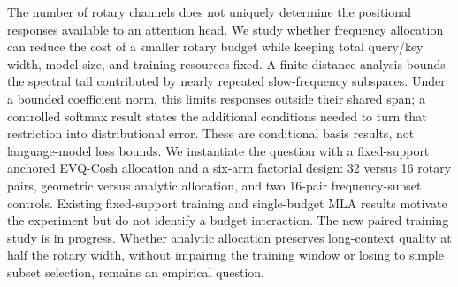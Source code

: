 The number of rotary channels does not uniquely determine the positional
responses available to an attention head. We study whether frequency allocation
can reduce the cost of a smaller rotary budget while keeping total query/key
width, model size, and training resources fixed. A finite-distance analysis bounds
the spectral tail contributed by nearly repeated slow-frequency subspaces.
Under a bounded coefficient norm, this limits responses outside their shared
span; a controlled softmax result states the additional conditions needed to
turn that restriction into distributional error. These are conditional basis
results, not language-model loss bounds. We instantiate the question with a
fixed-support anchored EVQ-Cosh allocation and a six-arm factorial design:
32 versus 16 rotary pairs, geometric versus analytic allocation, and two
16-pair frequency-subset controls. Existing fixed-support training and single-budget
MLA results motivate the experiment but do not identify a budget interaction.
The new paired training study is in progress. Whether analytic allocation
preserves long-context quality at half the rotary width, without impairing the
training window or losing to simple subset selection, remains an empirical
question.
